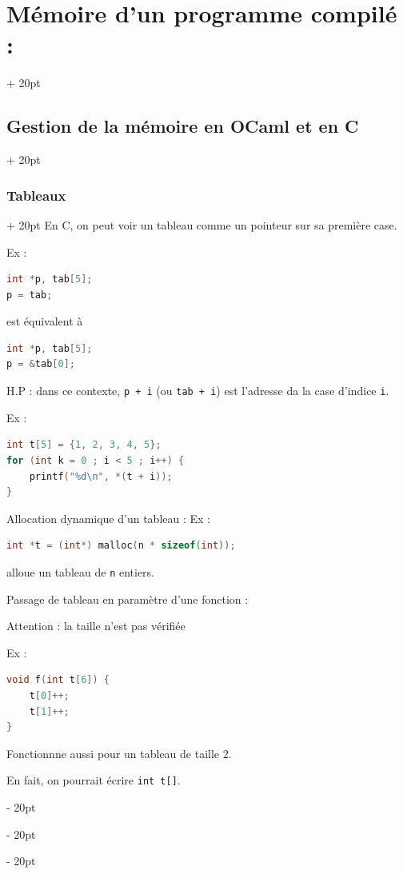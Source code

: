 \documentclass[a4paper, 12pt, twoside]{article}
\newcommand{\ind}[1][20pt]{\advance\leftskip + #1}
\newcommand{\deind}[1][20pt]{\advance\leftskip - #1}
\newenvironment{indentedenv}[1][20pt]{\par \ind[#1]}{\par \deind}
\newenvironment{indt}[2][20pt]{#2 \begin{indentedenv}[#1]}{\end{indentedenv}} %
\begin{document}
\begin{indt}{\section{Mémoire d'un programme compilé :}}
\begin{indt}{\subsection{Gestion de la mémoire en OCaml et en C}}
            \begin{indt}{\subsubsection{Tableaux}}
                En C, on peut voir un tableau comme un pointeur sur sa première case.
                
                Ex :
                \begin{lstlisting}[language=C, xleftmargin=80pt]
int *p, tab[5];
p = tab;
                \end{lstlisting}
                est équivalent à
                \begin{lstlisting}[language=C, xleftmargin=80pt]
int *p, tab[5];
p = &tab[0];
                \end{lstlisting}
                
                H.P : dans ce contexte, \texttt{p + i} (ou \texttt{tab + i}) est l'adresse da la case d'indice \texttt{i}.
                
                Ex :
                \begin{lstlisting}[language=C, xleftmargin=80pt]
int t[5] = {1, 2, 3, 4, 5};
for (int k = 0 ; i < 5 ; i++) {
    printf("%d\n", *(t + i));
}\end{lstlisting}
                
                Allocation dynamique d'un tableau :
                Ex :
                \begin{lstlisting}[language=C, xleftmargin=80pt]
int *t = (int*) malloc(n * sizeof(int));
                \end{lstlisting}
                alloue un tableau de \texttt{n} entiers.
                
                \vspace{6pt}
                
                Passage de tableau en paramètre d'une fonction :
                
                Attention : la taille n'est pas vérifiée
                
                Ex :
                \begin{lstlisting}[language=C, xleftmargin=80pt]
void f(int t[6]) {
    t[0]++;
    t[1]++;
}
                \end{lstlisting}
                Fonctionnne aussi pour un tableau de taille 2.
                
                En fait, on pourrait écrire \texttt{int t[]}.
                

\end{indt}
\end{indt}
\end{indt}
\end{document}
